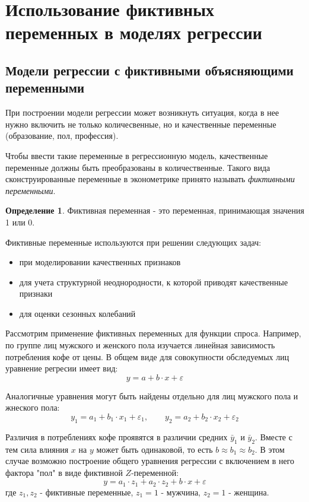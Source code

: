 \documentclass[aps,%
12pt,%
final,%
oneside,
onecolumn,%
musixtex, %
superscriptaddress,%
centertags]{article} %
\theoremstyle{plain}
\theoremstyle{definition}
\newtheorem{definition}{Определение}[subsection]
\theoremstyle{remark}
\begin{document}
\newpage

\section{Использование фиктивных переменных в моделях регрессии}

\subsection{Модели регрессии с фиктивными объясняющими переменными}

При построении модели регрессии может возникнуть ситуация, когда в нее нужно включить не только количесвенные, но и качественные переменные (образование, пол, профессия).

Чтобы ввести такие переменные в регрессионную модель, качественные переменные должны быть преобразованы в количественные. Такого вида сконструированные переменные в эконометрике принято называть \textit{фиктивными переменными}.

\begin{definition}
	Фиктивная переменная - это переменная, принимающая значения 1 или 0. 
\end{definition}

Фиктивные переменные используются при решении следующих задач:

\begin{itemize}
	\item при моделировании качественных признаков
	\item для учета структурной неоднородности, к которой приводят качественные признаки
	\item для оценки сезонных колебаний
\end{itemize}

Рассмотрим применение фиктивных переменных для функции спроса. Например, по группе лиц мужского и женского пола изучается линейная зависимость потребления кофе от цены. В общем виде для совокупности обследуемых лиц уравнение регресии имеет вид:
$$y = a + b \cdot x + \varepsilon$$

Аналогичные уравнения могут быть найдены отдельно для лиц мужского пола и жнеского пола:
$$y_1 = a_1 + b_1 \cdot x_1 + \varepsilon_1, \qquad y_2 = a_2 + b_2 \cdot x_2 + \varepsilon_2$$

Различия в потреблениях кофе проявятся в различии средних $\bar{y}_1$ и $\bar{y}_2$. Вместе с тем сила влияния $x$ на $y$ может быть одинаковой, то есть $b \approx b_1 \approx b_2$. В этом случае возможно построение общего уравнения регрессии с включением в него фактора "пол" в виде фиктивной $Z$-переменной:
$$y = a_1 \cdot z_1 + a_2 \cdot z_2 + b\cdot x+ \varepsilon$$
где $z_1, z_2$ - фиктивные переменные, $z_1 = 1$ - мужчина, $z_2=1$ - женщина.
\end{document}
